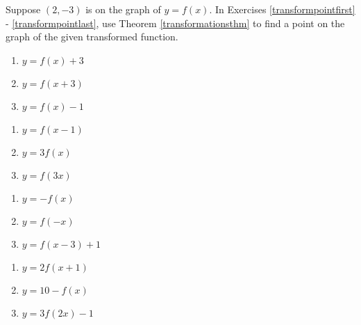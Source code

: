 \label{ExercisesforTransformations}

Suppose $(2,-3)$ is on the graph of $y = f(x)$.  In Exercises \ref{transformpointfirst} - \ref{transformpointlast}, use Theorem \ref{transformationsthm} to find a point on the graph of the given transformed function.  

\begin{multicols}{3}
\begin{enumerate}

\item $y = f(x)+3$ \label{transformpointfirst}
\item $y = f(x+3)$
\item $y = f(x)-1$

\setcounter{HW}{\value{enumi}}
\end{enumerate}
\end{multicols}

\begin{multicols}{3}
\begin{enumerate}
\setcounter{enumi}{\value{HW}}

\item $y = f(x-1)$
\item $y = 3f(x)$
\item $y = f(3x)$

\setcounter{HW}{\value{enumi}}
\end{enumerate}
\end{multicols}

\begin{multicols}{3}
\begin{enumerate}
\setcounter{enumi}{\value{HW}}

\item $y = -f(x)$
\item $y = f(-x)$
\item $y = f(x-3)+1$

\setcounter{HW}{\value{enumi}}
\end{enumerate}
\end{multicols}

\begin{multicols}{3}
\begin{enumerate}
\setcounter{enumi}{\value{HW}}

\item $y = 2f(x+1)$
\item $y = 10 - f(x)$
\item $y = 3f(2x) - 1$

\setcounter{HW}{\value{enumi}}
\end{enumerate}
\end{multicols}

